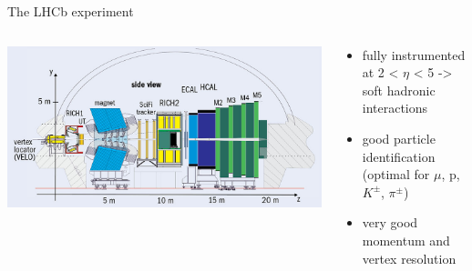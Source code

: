 \documentclass[aspectratio=1610, 9pt]{beamer}
\begin{document}
\begin{frame}{The LHCb experiment}
  \begin{columns}
    \begin{column}[c]{0.48\textwidth}
      \includegraphics[width=\textwidth]{plots/lhcb_side.jpg}
    \end{column}
    \begin{column}[c]{0.48\textwidth}
      \begin{itemize}
        \item fully instrumented at 2 < $\eta$ < 5 -> soft hadronic interactions
        \item good particle identification (optimal for $\mu$, p, $K^{\pm}$, $\pi^{\pm}$)
        \item very good momentum and vertex resolution
      \end{itemize}
    \end{column}
  \end{columns}
\end{frame}
\end{document}
